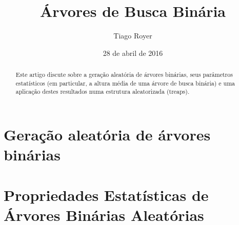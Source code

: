 \documentclass{article}
\theoremstyle{definition}
\theoremstyle{remark}
\begin{document}
\title{Árvores de Busca Binária}
\author{Tiago Royer}
\date{28 de abril de 2016}
\maketitle

\begin{abstract}
    Este artigo discute sobre a geração aleatória de árvores binárias,
    seus parâmetros estatísticos
    (em particular,
    a altura média de uma árvore de busca binária)
    e uma aplicação destes resultados numa estrutura aleatorizada
    (treaps).
\end{abstract}



\section{Geração aleatória de árvores binárias}




\section{Propriedades Estatísticas de Árvores Binárias Aleatórias}










\end{document}
